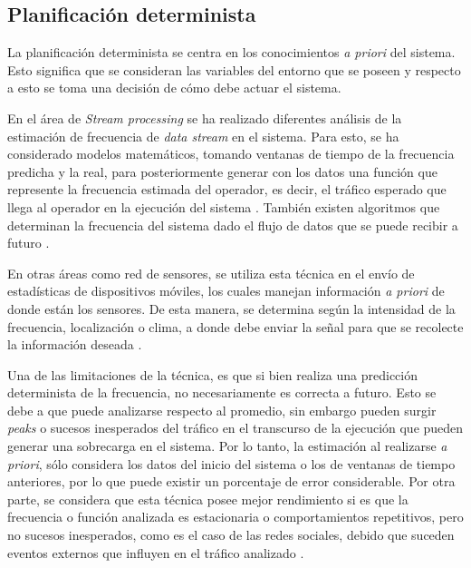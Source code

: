 \subsection{Planificaci\'on determinista}
\label{sec:planificacionBC}

La planificaci\'on determinista se centra en los conocimientos \textit{a priori} del sistema. Esto significa que se consideran las variables del entorno que se poseen y respecto a esto se toma una decisi\'on de c\'omo debe actuar el sistema. 

En el \'area de \textit{Stream processing} se ha realizado diferentes an\'alisis de la estimaci\'on de frecuencia de \textit{data stream} en el sistema. Para esto, se ha considerado modelos matem\'aticos, tomando ventanas de tiempo de la frecuencia predicha y la real, para posteriormente generar con los datos una funci\'on que represente la frecuencia estimada del operador, es decir, el tr\'afico esperado que llega al operador en la ejecuci\'on del sistema \citep{Ganguly09}. \normalsize{Tambi\'en existen algoritmos} que determinan la frecuencia del sistema dado el flujo de datos que se puede recibir a futuro \citep{BhuvanagiriGKS06}.

En otras \'areas como red de sensores, se utiliza esta t\'ecnica en el env\'io de estad\'isticas de dispositivos m\'oviles, los cuales manejan informaci\'on \textit{a priori} de donde est\'an los sensores. De esta manera, se determina seg\'un la intensidad de la frecuencia, localizaci\'on o clima, a donde debe enviar la se\~nal para que se recolecte la informaci\'on deseada \citep{DongTS07}.

Una de las limitaciones de la t\'ecnica, es que si bien realiza una predicci\'on determinista de la frecuencia, no necesariamente es correcta a futuro. Esto se debe a que puede analizarse respecto al promedio, sin embargo pueden surgir \textit{peaks} o sucesos inesperados del tr\'afico en el transcurso de la ejecuci\'on que pueden generar una sobrecarga en el sistema. Por lo tanto, la estimaci\'on al realizarse \textit{a priori}, s\'olo considera los datos del inicio del sistema o los de ventanas de tiempo anteriores, por lo que puede existir un porcentaje de error considerable. Por otra parte, se considera que esta t\'ecnica posee mejor rendimiento si es que la frecuencia o funci\'on analizada es estacionaria o comportamientos repetitivos, pero no sucesos inesperados, como es el caso de las redes sociales, debido que suceden eventos externos que influyen en el tr\'afico analizado \citep{KarpSP03}.

